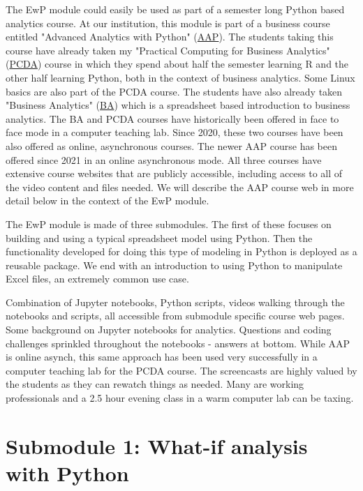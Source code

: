 \documentclass[ited,blindrev]{informs3}              %
\begin{document}
The EwP module could easily be used as part of a semester long Python based analytics course. At our institution, this module is part of a business course entitled "Advanced Analytics with Python" (\href{http://www.sba.oakland.edu/faculty/isken/courses/mis6900}{AAP}). The students taking this course have already taken my "Practical Computing for Business Analytics" (\href{http://www.sba.oakland.edu/faculty/isken/courses/mis5470}{PCDA}) course in which they spend about half the semester learning R and the other half learning Python, both in the context of business analytics. Some Linux basics are also part of the PCDA course. The students have also already taken "Business Analytics" (\href{http://www.sba.oakland.edu/faculty/isken/courses/mis5460}{BA}) which is a spreadsheet based introduction to business analytics. The BA and PCDA courses have historically been offered in face to face mode in a computer teaching lab. Since 2020, these two courses have been also offered as online, asynchronous courses. The newer AAP course has been offered since 2021 in an online asynchronous mode. All three courses have extensive course websites that are publicly accessible, including access to all of the video content and files needed. We will describe the AAP course web in more detail below in the context of the EwP module.

The EwP module is made of three submodules. The first of these focuses on building and using a typical spreadsheet model using Python. Then the functionality developed for doing this type of modeling in Python is deployed as a reusable package. We end with an introduction to using Python to manipulate Excel files, an extremely common use case.

Combination of Jupyter notebooks, Python scripts, videos walking through the notebooks and scripts, all accessible from submodule specific course web pages. Some background on Jupyter notebooks for analytics. Questions and coding challenges sprinkled throughout the notebooks - answers at bottom. While AAP is online asynch, this same approach has been used very successfully in a computer teaching lab for the PCDA course. The screencasts are highly valued by the students as they can rewatch things as needed. Many are working professionals and a 2.5 hour evening class in a warm computer lab can be taxing.

\section{Submodule 1: What-if analysis with Python}
\end{document}

